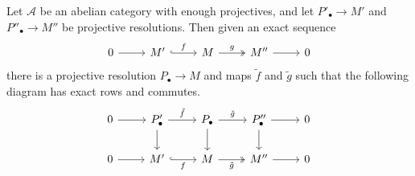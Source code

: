 \documentclass[main.tex]{subfiles}
\begin{document}
\begin{theorem}
  \label{thm:horseshoe_lemma}
  Let $\mathcal{A}$ be an abelian category with enough projectives, and let $P'_{\bullet} \to M'$ and $P''_{\bullet} \to M''$ be projective resolutions. Then given an exact sequence
  \begin{equation*}
    \begin{tikzcd}
      0
      \arrow[r]
      & M'
      \arrow[r, hook, "f"]
      & M
      \arrow[r, two heads, "g"]
      & M''
      \arrow[r]
      & 0
    \end{tikzcd}
  \end{equation*}
  there is a projective resolution $P_{\bullet} \to M$ and maps $\tilde{f}$ and $\tilde{g}$ such that the following diagram has exact rows and commutes.
  \begin{equation*}
    \begin{tikzcd}
      0
      \arrow[r]
      & P'_{\bullet}
      \arrow[r, "\tilde{f}"]
      \arrow[d]
      & P_{\bullet}
      \arrow[r, "\tilde{g}"]
      \arrow[d]
      & P''_{\bullet}
      \arrow[r]
      \arrow[d]
      & 0
      \\
      0
      \arrow[r]
      & M'
      \arrow[r, swap, hook, "f"]
      & M
      \arrow[r, swap, two heads, "\tilde{g}"]
      & M''
      \arrow[r]
      & 0
    \end{tikzcd}
  \end{equation*}
\end{theorem}
\end{document}
